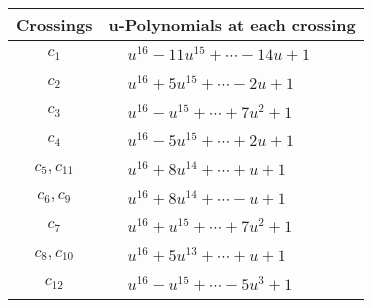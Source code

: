 \documentclass[1p]{elsarticle_modified}
\theoremstyle{definition}
\begin{document}
\begin{tabular}{m{50pt}|m{274pt}}
Crossings & \hspace{64pt}u-Polynomials at each crossing \\
\hline $$\begin{aligned}c_{1}\end{aligned}$$&$\begin{aligned}
&u^{16}-11 u^{15}+\cdots-14 u+1
\end{aligned}$\\
\hline $$\begin{aligned}c_{2}\end{aligned}$$&$\begin{aligned}
&u^{16}+5 u^{15}+\cdots-2 u+1
\end{aligned}$\\
\hline $$\begin{aligned}c_{3}\end{aligned}$$&$\begin{aligned}
&u^{16}- u^{15}+\cdots+7 u^2+1
\end{aligned}$\\
\hline $$\begin{aligned}c_{4}\end{aligned}$$&$\begin{aligned}
&u^{16}-5 u^{15}+\cdots+2 u+1
\end{aligned}$\\
\hline $$\begin{aligned}c_{5},c_{11}\end{aligned}$$&$\begin{aligned}
&u^{16}+8 u^{14}+\cdots+u+1
\end{aligned}$\\
\hline $$\begin{aligned}c_{6},c_{9}\end{aligned}$$&$\begin{aligned}
&u^{16}+8 u^{14}+\cdots- u+1
\end{aligned}$\\
\hline $$\begin{aligned}c_{7}\end{aligned}$$&$\begin{aligned}
&u^{16}+u^{15}+\cdots+7 u^2+1
\end{aligned}$\\
\hline $$\begin{aligned}c_{8},c_{10}\end{aligned}$$&$\begin{aligned}
&u^{16}+5 u^{13}+\cdots+u+1
\end{aligned}$\\
\hline $$\begin{aligned}c_{12}\end{aligned}$$&$\begin{aligned}
&u^{16}- u^{15}+\cdots-5 u^3+1
\end{aligned}$\\
\hline
\end{tabular}\\~\\
\end{document}
